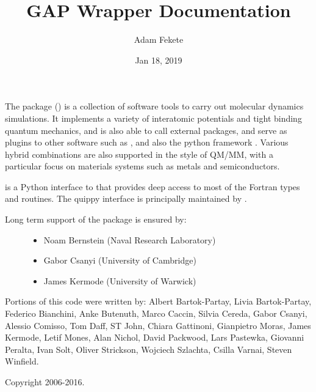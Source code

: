 \documentclass[letterpaper,10pt,english]{sphinxmanual}
\title{GAP Wrapper Documentation}
\date{Jan 18, 2019}
\author{Adam Fekete}
\begin{document}
\pagestyle{empty}
\sphinxmaketitle
\pagestyle{plain}
\sphinxtableofcontents
\pagestyle{normal}
\label{\detokenize{index::doc}}\label{\detokenize{index:module-quippy}}


The  package () is a
collection of software tools to carry out molecular dynamics
simulations. It implements a variety of interatomic potentials and
tight binding quantum mechanics, and is also able to call external
packages, and serve as plugins to other software such as ,  and also
the python framework .  Various
hybrid combinations are also supported in the style of QM/MM, with a
particular focus on materials systems such as metals and
semiconductors.

 is a Python interface to  that provides deep access to
most of the Fortran types and routines. The quippy interface is principally
maintained by .
\begin{description}
\item[{Long term support of the package is ensured by:}] \leavevmode\begin{itemize}
\item {} 
Noam Bernstein (Naval Research Laboratory)

\item {} 
Gabor Csanyi (University of Cambridge)

\item {} 
James Kermode (University of Warwick)

\end{itemize}

\end{description}

Portions of this code were written by: Albert Bartok-Partay, Livia
Bartok-Partay, Federico Bianchini, Anke Butenuth, Marco Caccin,
Silvia Cereda, Gabor Csanyi, Alessio Comisso, Tom Daff, ST John,
Chiara Gattinoni, Gianpietro Moras, James Kermode, Letif Mones,
Alan Nichol, David Packwood, Lars Pastewka, Giovanni Peralta, Ivan
Solt, Oliver Strickson, Wojciech Szlachta, Csilla Varnai, Steven
Winfield.

Copyright 2006-2016.
\end{document}
